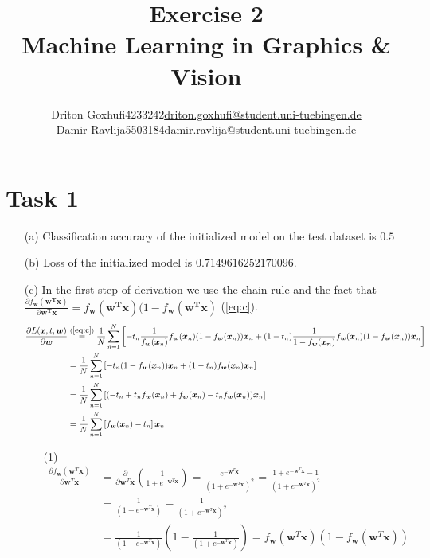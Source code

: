 \documentclass [a4paper, 11pt] {article}
\makeatletter
\newcommand{\courseName}{Machine Learning in Graphics \& Vision}
\newcommand{\homeworkNum}{2}
\newcommand{\studentOne}{Driton Goxhufi}
\newcommand{\studentTwo} {Damir Ravlija}
\newcommand{\matrikelNrStOne}{4233242}
\newcommand{\matrikelNrStTwo}{5503184}
\newcommand{\mailStOne}{driton.goxhufi@student.uni-tuebingen.de}
\newcommand{\mailStTwo}{damir.ravlija@student.uni-tuebingen.de}
\renewcommand{\v}[1]{\boldsymbol{#1}}
\makeatother
\begin{document}
	
\title{\vspace{-1.5cm}\textbf{Exercise \homeworkNum} \\ 
	\courseName}
\author{\begin{tabular}{lcr}
		\studentOne & \matrikelNrStOne & \href{mailto:\mailStOne}{\mailStOne} \\
		\studentTwo & \matrikelNrStTwo & \href{mailto:\mailStTwo}{\mailStTwo} 
\end{tabular}}	
\date{}
\maketitle


\section{Task 1}
\begin{enumerate}
\item[(a)]
Classification accuracy of the initialized model on the test dataset is $0.5$


\item[(b)]
Loss of the initialized model is $0.7149616252170096$.

\item[(c)]
In the first step of derivation we use the chain rule and the fact that $\frac{\partial f_{\v{w}}(\v{w^T}\v{x})}{\partial \v{w^T}\v{x}} = f_{\v{w}}(\v{w^T}\v{x})(1-f_{\v{w}}(\v{w^T}\v{x})$ (\ref{eq:c}).
\begin{align*}
\frac{\partial L(\v{x}, t, \v{w})}{\partial \v{w}} &\stackrel{(\ref{eq:c})}{=} \frac{1}{N}\sum_{n=1}^{N}\left[-t_n \frac{1}{f_{\v{w}}(\v{x}_n)}f_{\v{w}}(\v{x}_n)(1-f_{\v{w}}(\v{x}_n))\v{x}_n + (1-t_n)\frac{1}{1-f_{\v{w}}(\v{x_n})}f_{\v{w}}(\v{x}_n)(1-f_{\v{w}}(\v{x}_n))\v{x}_n \right] \\
&= \frac{1}{N}\sum_{n=1}^{N}\left[-t_n(1-f_{\v{w}}(\v{x}_n))\v{x}_n + (1-t_n)f_{\v{w}}(\v{x}_n)\v{x}_n \right] \\
&= \frac{1}{N}\sum_{n=1}^{N}\left[(-t_n + t_n f_{\v{w}}(\v{x}_n) + f_{\v{w}}(\v{x}_n) - t_nf_{\v{w}}(\v{x}_n))\v{x}_n\right] \\
&= \frac{1}{N}\sum_{n=1}^{N}\left[ f_{\v{w}}(\v{x}_n) - t_n\right]\v{x}_n
\end{align*}

\begin{enumerate}
	\item[(1)]\label{eq:c} 
	\begin{align*}
	\frac{\partial f_{\v{w}}(\v{w}^T \v{x})}{\partial \v{w}^T \v{x}} &= \frac{\partial}{\partial \v{w}^T \v{x}}\left(\frac{1}{1 + e^{-\v{w}^{T}\v{x}}}\right) = \frac{e^{-\v{w}^{T}\v{x}}}{{(1 + e^{-\v{w}^{T}\v{x}})}^2} = \frac{1 + e^{-\v{w}^{T}\v{x}} - 1}{{(1 + e^{-\v{w}^{T}\v{x}})}^2} \\
	&= \frac{1}{{(1 + e^{-\v{w}^{T}\v{x}})}} - \frac{1}{{(1 + e^{-\v{w}^{T}\v{x}})}^2} \\
	&= \frac{1}{{(1 + e^{-\v{w}^{T}\v{x}})}} \left(1 - \frac{1}{{(1 + e^{-\v{w}^{T}\v{x}})}}\right) = f_{\v{w}}(\v{w}^{T}\v{x})(1 - f_{\v{w}}(\v{w}^{T}\v{x}))
	\end{align*}
\end{enumerate}


\end{enumerate}
\end{document}
